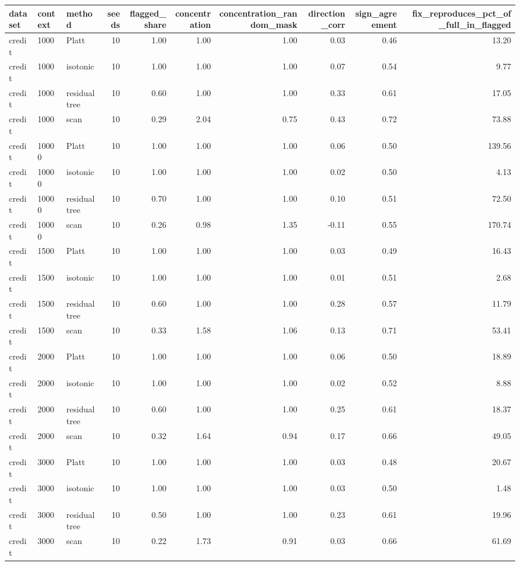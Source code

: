 \begin{tabular}{lllrrrrrrr}
\toprule
dataset & context & method & seeds & flagged_share & concentration & concentration_random_mask & direction_corr & sign_agreement & fix_reproduces_pct_of_full_in_flagged \\
\midrule
credit & 1000 & Platt & 10 & 1.00 & 1.00 & 1.00 & 0.03 & 0.46 & 13.20 \\
credit & 1000 & isotonic & 10 & 1.00 & 1.00 & 1.00 & 0.07 & 0.54 & 9.77 \\
credit & 1000 & residual tree & 10 & 0.60 & 1.00 & 1.00 & 0.33 & 0.61 & 17.05 \\
credit & 1000 & scan & 10 & 0.29 & 2.04 & 0.75 & 0.43 & 0.72 & 73.88 \\
credit & 10000 & Platt & 10 & 1.00 & 1.00 & 1.00 & 0.06 & 0.50 & 139.56 \\
credit & 10000 & isotonic & 10 & 1.00 & 1.00 & 1.00 & 0.02 & 0.50 & 4.13 \\
credit & 10000 & residual tree & 10 & 0.70 & 1.00 & 1.00 & 0.10 & 0.51 & 72.50 \\
credit & 10000 & scan & 10 & 0.26 & 0.98 & 1.35 & -0.11 & 0.55 & 170.74 \\
credit & 1500 & Platt & 10 & 1.00 & 1.00 & 1.00 & 0.03 & 0.49 & 16.43 \\
credit & 1500 & isotonic & 10 & 1.00 & 1.00 & 1.00 & 0.01 & 0.51 & 2.68 \\
credit & 1500 & residual tree & 10 & 0.60 & 1.00 & 1.00 & 0.28 & 0.57 & 11.79 \\
credit & 1500 & scan & 10 & 0.33 & 1.58 & 1.06 & 0.13 & 0.71 & 53.41 \\
credit & 2000 & Platt & 10 & 1.00 & 1.00 & 1.00 & 0.06 & 0.50 & 18.89 \\
credit & 2000 & isotonic & 10 & 1.00 & 1.00 & 1.00 & 0.02 & 0.52 & 8.88 \\
credit & 2000 & residual tree & 10 & 0.60 & 1.00 & 1.00 & 0.25 & 0.61 & 18.37 \\
credit & 2000 & scan & 10 & 0.32 & 1.64 & 0.94 & 0.17 & 0.66 & 49.05 \\
credit & 3000 & Platt & 10 & 1.00 & 1.00 & 1.00 & 0.03 & 0.48 & 20.67 \\
credit & 3000 & isotonic & 10 & 1.00 & 1.00 & 1.00 & 0.03 & 0.50 & 1.48 \\
credit & 3000 & residual tree & 10 & 0.50 & 1.00 & 1.00 & 0.23 & 0.61 & 19.96 \\
credit & 3000 & scan & 10 & 0.22 & 1.73 & 0.91 & 0.03 & 0.66 & 61.69 \\

\end{tabular}
